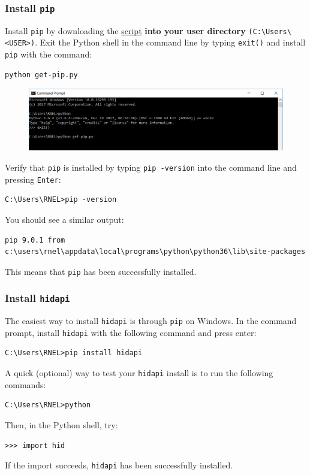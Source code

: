 \documentclass[10pt,oneside,a4paper]{article}
\begin{document}
\subsubsection{Install \texttt{pip}}
Install \texttt{pip} by downloading the \href{https://bootstrap.pypa.io/get-pip.py}{\color{blue}script} \textbf{into your user directory} \texttt{(C:\textbackslash Users\textbackslash <USER>)}. Exit the Python shell in the command line by typing \texttt{exit()} and install \texttt{pip} with the command:
\begin{verbatim}
python get-pip.py
\end{verbatim}
\begin{figure}[H]
\includegraphics[width=\textwidth]{pip.png}
\end{figure}
Verify that \texttt{pip} is installed by typing \texttt{pip -version} into the command line and pressing \texttt{Enter}:
\begin{verbatim}
C:\Users\RNEL>pip -version
\end{verbatim}
You should see a similar output:
\begin{verbatim}
pip 9.0.1 from c:\users\rnel\appdata\local\programs\python\python36\lib\site-packages
\end{verbatim}
This means that \texttt{pip} has been successfully installed.
\subsubsection{Install \texttt{hidapi}}
The easiest way to install \texttt{hidapi} is through \texttt{pip} on Windows. In the command prompt, install  \texttt{hidapi} with the following command and press enter:
\begin{verbatim}
C:\Users\RNEL>pip install hidapi
\end{verbatim}
A quick (optional) way to test your \texttt{hidapi} install is to run the following commands:
\begin{verbatim}
C:\Users\RNEL>python
\end{verbatim}
Then, in the Python shell, try:
\begin{verbatim}
>>> import hid
\end{verbatim}
If the import succeeds, \texttt{hidapi} has been successfully installed.
\end{document}
